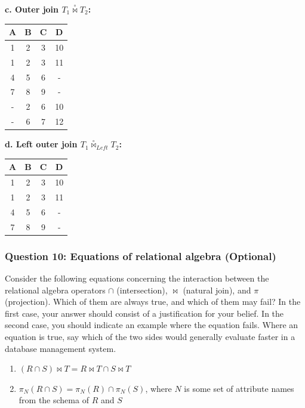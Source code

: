 \textbf{c. Outer join \(T_1 \overset{\circ}{\bowtie} T_2\):}
\begin{tabular}{|c|c|c|c|}
\hline
A & B & C & D \\
\hline
1 & 2 & 3 & 10 \\
\hline
1 & 2 & 3 & 11 \\
\hline
4 & 5 & 6 & - \\
\hline
7 & 8 & 9 & - \\
\hline
- & 2 & 6 & 10 \\
\hline
- & 6 & 7 & 12 \\
\hline
\end{tabular}

\textbf{d. Left outer join \(T_1 \overset{\circ}{\bowtie}_{Left} T_2\):}
\begin{tabular}{|c|c|c|c|}
\hline
A& B& C& D \\
\hline
1& 2& 3& 10 \\
1& 2& 3& 11 \\
4& 5& 6& - \\
7& 8& 9& - \\
\hline
\end{tabular}
\subsubsection{Question 10: Equations of relational algebra (Optional)}
Consider the following equations concerning the interaction between the relational algebra operators \(\cap\) (intersection), \(\bowtie\) (natural join), and \(\pi\) (projection). Which of them are always true, and which of them may fail? In the first case, your answer should consist of a justification for your belief. In the second case, you should indicate an example where the equation fails. Where an equation is true, say which of the two sides would generally evaluate faster in a database management system.

\begin{enumerate}
    \item[a.] \((R \cap S) \bowtie T = R \bowtie T \cap S \bowtie T\)
    \item[b.] \(\pi_N (R \cap S) = \pi_N (R) \cap \pi_N (S)\), where \(N\) is some set of attribute names from the schema of \(R\) and \(S\)
\end{enumerate}

